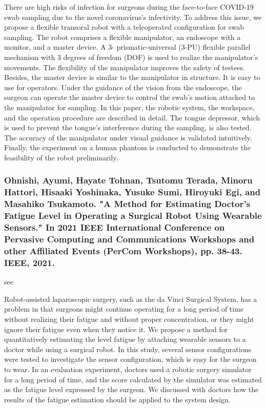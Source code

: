 \documentclass[conference]{IEEEtran}
\begin{document}
There are high risks of infection for surgeons during the face-to-face COVID-19 swab sampling due to the novel coronavirus’s infectivity. To address this issue, we propose a flexible transoral robot with a teleoperated configuration for swab sampling. The robot comprises a flexible manipulator, an endoscope with a monitor, and a master device. A 3- prismatic-universal (3-PU) flexible parallel mechanism with 3 degrees of freedom (DOF) is used to realize the manipulator’s movements. The flexibility of the manipulator improves the safety of testees. Besides, the master device is similar to the manipulator in structure. It is easy to use for operators. Under the guidance of the vision from the endoscope, the surgeon can operate the master device to control the swab’s motion attached to the manipulator for sampling. In this paper, the robotic system, the workspace, and the operation procedure are described in detail. The tongue depressor, which is used to prevent the tongue’s interference during the sampling, is also tested. The accuracy of the manipulator under visual guidance is validated intuitively. Finally, the experiment on a human phantom is conducted to demonstrate the feasibility of the robot preliminarily.

\medskip
\subsubsection{Ohnishi, Ayumi, Hayate Tohnan, Tsutomu Terada, Minoru Hattori, Hisaaki Yoshinaka, Yusuke Sumi, Hiroyuki Egi, and Masahiko Tsukamoto. "A Method for Estimating Doctor's Fatigue Level in Operating a Surgical Robot Using Wearable Sensors." In 2021 IEEE International Conference on Pervasive Computing and Communications Workshops and other Affiliated Events (PerCom Workshops), pp. 38-43. IEEE, 2021.}
see \cite{ohnishi2021method}

Robot-assisted laparoscopic surgery, such as the da Vinci Surgical System, has a problem in that surgeons might continue operating for a long period of time without realizing their fatigue and without proper concentration, or they might ignore their fatigue even when they notice it. We propose a method for quantitatively estimating the level fatigue by attaching wearable sensors to a doctor while using a surgical robot. In this study, several sensor configurations were tested to investigate the sensor configuration, which is easy for the surgeon to wear. In an evaluation experiment, doctors used a robotic surgery simulator for a long period of time, and the score calculated by the simulator was estimated as the fatigue level expressed by the surgeon. We discussed with doctors how the results of the fatigue estimation should be applied to the system design.
\end{document}
